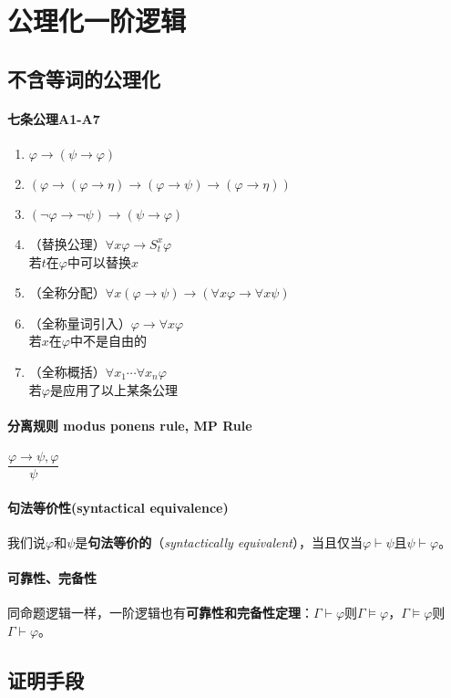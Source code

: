 \documentclass[b5paper,oneside]{ctexbook}
\begin{document}
\section{公理化一阶逻辑}
\subsection{不含等词的公理化}
\paragraph{七条公理A1-A7}
\begin{enumerate}
\item $\varphi \to (\psi\to\varphi)$
\item $(\varphi\to(\varphi\to\eta)\to(\varphi\to\psi)\to(\varphi\to\eta))$
\item $(\neg\varphi\to\neg\psi)\to(\psi\to\varphi)$
\item （替换公理）$\forall x\varphi\to S_t^x\varphi$\\若$t$在$\varphi$中可以替换$x$
\item （全称分配）$\forall x(\varphi\to\psi)\to(\forall x\varphi\to\forall x\psi)$
\item （全称量词引入）$\varphi\to\forall x\varphi$\\若$x$在$\varphi$中不是自由的
\item （全称概括）$\forall x_1\cdots \forall x_n\varphi$\\若$\varphi$是应用了以上某条公理
\end{enumerate}
\paragraph{分离规则 modus ponens rule, MP Rule}$\dfrac{\varphi\to\psi ,\varphi}{\psi}$
\paragraph{句法等价性(syntactical equivalence)}我们说$\varphi$和$\psi$是\textbf{句法等价的}（\textit{syntactically equivalent}），当且仅当$\varphi\vdash\psi$且$\psi\vdash\varphi$。
\paragraph{可靠性、完备性}同命题逻辑一样，一阶逻辑也有\textbf{可靠性和完备性定理}：$\Gamma\vdash\varphi$则$\Gamma\models\varphi$，$\Gamma\models\varphi$则$\Gamma\vdash\varphi$。
\subsection{证明手段}
\end{document}
